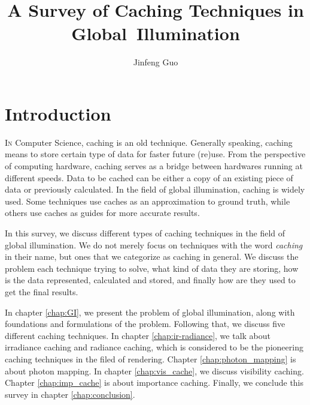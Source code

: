 \documentclass[]{book}
\title{A Survey of Caching Techniques in Global~Illumination}
\author{Jinfeng Guo}
\begin{document}
\maketitle

\tableofcontents
{}

\listoffigures
{}

\listofalgorithms
{}

\chapter{Introduction}
\label{chap:intro}
\lettrine{I}{n} Computer Science, caching is an old technique.
Generally speaking, caching means to store certain type of data for faster future (re)use.
From the perspective of computing hardware, caching serves as a bridge between hardwares running at different speeds.
Data to be cached can be either a copy of an existing piece of data or previously calculated.
In the field of global illumination, caching is widely used.
Some techniques use caches as an approximation to ground truth, while others use caches as guides for more accurate results.

In this survey, we discuss different types of caching techniques in the field of global illumination.
We do not merely focus on techniques with the word \textit{caching} in their name, but ones that we categorize as caching in general.
We discuss the problem each technique trying to solve, what kind of data they are storing, how is the data represented, calculated and stored, and finally how are they used to get the final results.

In chapter \ref{chap:GI}, we present the problem of global illumination, along with foundations and formulations of the problem.
Following that, we discuss five different caching techniques.
In chapter \ref{chap:ir-radiance}, we talk about irradiance caching and radiance caching, which is considered to be the pioneering caching techniques in the filed of rendering.
Chapter \ref{chap:photon_mapping} is about photon mapping.
In chapter \ref{chap:vis_cache}, we discuss visibility caching.
Chapter \ref{chap:imp_cache} is about importance caching.
Finally, we conclude this survey in chapter \ref{chap:conclusion}.

\end{document}
